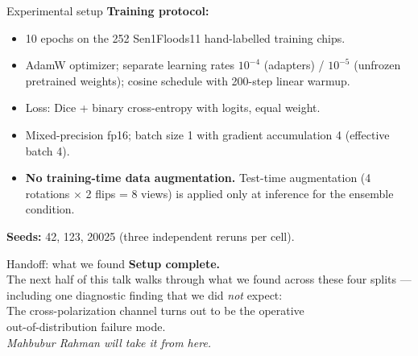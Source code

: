 \documentclass[aspectratio=169,11pt]{beamer}
\begin{document}
\begin{frame}{Experimental setup}
\textbf{Training protocol:}
\begin{itemize}
    \item 10 epochs on the 252 Sen1Floods11 hand-labelled training chips.
    \item AdamW optimizer; separate learning rates $10^{-4}$ (adapters) / $10^{-5}$ (unfrozen pretrained weights); cosine schedule with 200-step linear warmup.
    \item Loss: Dice + binary cross-entropy with logits, equal weight.
    \item Mixed-precision fp16; batch size 1 with gradient accumulation 4 (effective batch 4).
    \item \textbf{No training-time data augmentation.} Test-time augmentation (4 rotations $\times$ 2 flips = 8 views) is applied only at inference for the ensemble condition.
\end{itemize}
\vspace{0.4em}
\textbf{Seeds:} 42, 123, 20025 (three independent reruns per cell).
\end{frame}

\begin{frame}{Handoff: what we found}
\centering
\vspace{0.4em}
\textbf{\large Setup complete.}\\[1em]
The next half of this talk walks through what we found across these four splits --- including one diagnostic finding that we did \emph{not} expect:\\[1.2em]
\textcolor{warn}{\large The cross-polarization channel turns out to be the operative\\out-of-distribution failure mode.}\\[1.5em]
\emph{Mahbubur Rahman will take it from here.}
\end{frame}
\end{document}
